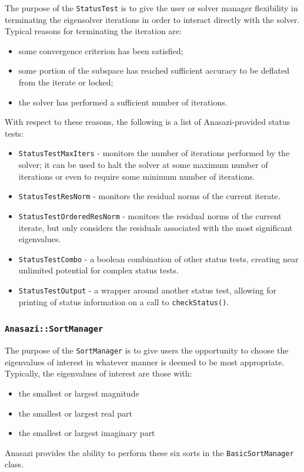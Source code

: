 \documentclass[acmtoms]{acmtrans2m}
\newcommand{\aspace}[1]{\texttt{#1}}
\begin{document}
The purpose of the \aspace{StatusTest} is to give the user or solver
manager flexibility in terminating the eigensolver iterations in
order to interact directly with the solver. Typical
reasons for terminating the iteration are:
\begin{itemize}
  \item some convergence criterion has been satisfied;
  \item some portion of the subspace has reached sufficient accuracy to be
  deflated from the iterate or locked;
  \item the solver has performed a sufficient number of iterations.
\end{itemize}
With respect to these reasons, the following is a list of Anasazi-provided status tests:
\begin{itemize}
  \item \aspace{StatusTestMaxIters} - monitors the number of iterations
    performed by the solver; it can be used to halt the solver at some maximum number of iterations
    or even to require some minimum number of iterations.
  \item \aspace{StatusTestResNorm} - monitors the residual norms of the
    current iterate.
  \item \aspace{StatusTestOrderedResNorm} - monitors the residual
    norms of the current iterate, but only considers the residuals associated with the
    most significant eigenvalues.
  \item \aspace{StatusTestCombo} - a boolean combination of
    other status tests, creating near unlimited potential for complex status tests.
  \item \aspace{StatusTestOutput} - a wrapper around another
    status test, allowing for printing of status information on a call to
    \verb!checkStatus()!.
\end{itemize}

\subsubsection{\aspace{Anasazi::SortManager}}

The purpose of the \aspace{SortManager} is to give users the opportunity to choose the 
eigenvalues of interest in whatever manner is deemed to be most appropriate. 
Typically, the eigenvalues of interest are those with:
\begin{itemize}
  \item the smallest or largest magnitude
  \item the smallest or largest real part
  \item the smallest or largest imaginary part
\end{itemize}
Anasazi provides the ability to perform these six sorts in the \aspace{BasicSortManager} class.
\end{document}
